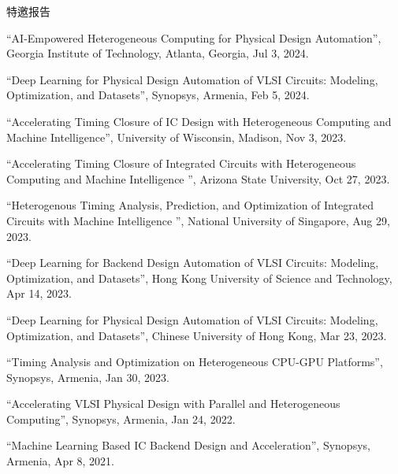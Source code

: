 \begin{rSection}{特邀报告}
\begin{description}[font=\normalfont]
\item[{[10]}]{
``AI-Empowered Heterogeneous Computing for Physical Design Automation'', Georgia Institute of Technology, Atlanta, Georgia, Jul 3, 2024. 
}

\item[{[9]}]{
``Deep Learning for Physical Design Automation of VLSI Circuits: Modeling, Optimization, and Datasets'', Synopsys, Armenia, Feb 5, 2024. 
}

\item[{[8]}]{
``Accelerating Timing Closure of IC Design with Heterogeneous Computing and Machine Intelligence'', University of Wisconsin, Madison, Nov 3, 2023. 
}

\item[{[7]}]{
``Accelerating Timing Closure of Integrated Circuits with Heterogeneous Computing and Machine Intelligence '', Arizona State University, Oct 27, 2023. 
}

\item[{[6]}]{
``Heterogenous Timing Analysis, Prediction, and Optimization of Integrated Circuits with Machine Intelligence '', National University of Singapore, Aug 29, 2023. 
}

\item[{[5]}]{
``Deep Learning for Backend Design Automation of VLSI Circuits: Modeling, Optimization, and Datasets'', Hong Kong University of Science and Technology, Apr 14, 2023. 
}

\item[{[4]}]{
``Deep Learning for Physical Design Automation of VLSI Circuits: Modeling, Optimization, and Datasets'', Chinese University of Hong Kong, Mar 23, 2023. 
}

\item[{[3]}]{
``Timing Analysis and Optimization on Heterogeneous CPU-GPU Platforms'', Synopsys, Armenia, Jan 30, 2023. 
}

\item[{[2]}]{
``Accelerating VLSI Physical Design with Parallel and Heterogeneous Computing'', Synopsys, Armenia, Jan 24, 2022. 
}

\item[{[1]}]{
``Machine Learning Based IC Backend Design and Acceleration'', Synopsys, Armenia, Apr 8, 2021. 
}

\end{description}

\end{rSection}
